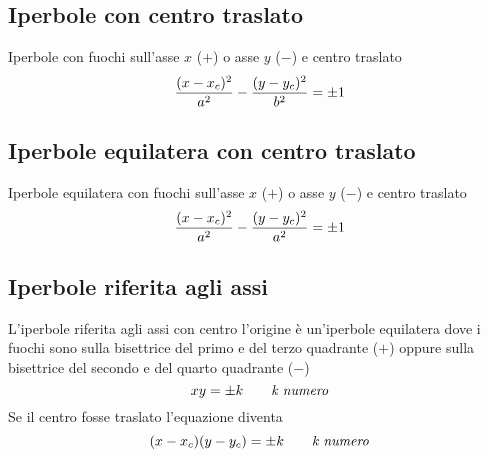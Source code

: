 \documentclass{article}
\begin{document}
  \subsection*{Iperbole con centro traslato}
  Iperbole con fuochi sull'asse $x$ ($+$) o asse $y$ ($-$) e centro traslato
  \begin{equation}
    \frac{(x-x_c)^2}{a^2} - \frac{(y-y_c)^2}{b^2} = \pm 1 \\
  \end{equation}

  \subsection*{Iperbole equilatera con centro traslato}
  Iperbole equilatera con fuochi sull'asse $x$ ($+$) o asse $y$ ($-$) e centro traslato
  \begin{equation}
    \frac{(x-x_c)^2}{a^2} - \frac{(y-y_c)^2}{a^2} = \pm 1 \\
  \end{equation}

  \subsection*{Iperbole riferita agli assi}
  L'iperbole riferita agli assi con centro l'origine è un'iperbole equilatera dove i fuochi sono sulla bisettrice del primo e del terzo quadrante ($+$) oppure sulla bisettrice del secondo e del quarto quadrante ($-$)
  \begin{equation}
    xy = \pm k \qquad \text{\textit{k numero}}
  \end{equation}
  Se il centro fosse traslato l'equazione diventa
  \begin{equation}
    (x-x_c)(y-y_c) = \pm k \qquad \text{\textit{k numero}}
  \end{equation}
\end{document}
